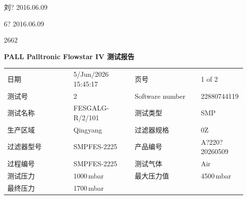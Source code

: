 \documentclass[UTF8,10pt,a4paper,fontset=fandol]{ctexart}
\newcommand{\fieldvalue}[1]{#1}
\newcommand{\handwritten}[1]{#1}
\begin{document}
\handwritten{刘? 2016.06.09}

\handwritten{6? 2016.06.09}

\handwritten{2662}


\newpage

\begin{center}
\textbf{PALL Palltronic Flowstar IV 测试报告}
\end{center}

\begin{tabular}{@{}p{0.27\linewidth}p{0.25\linewidth}p{0.27\linewidth}p{0.18\linewidth}@{}}
日期 &
\fieldvalue{5/Jun/2026 15:45:17} &
页号 &
\fieldvalue{1 of 2}
\\[2pt]

测试号 &
\fieldvalue{2} &
Software number &
\fieldvalue{22880744119}
\\[2pt]

测试名称 &
\fieldvalue{FESGALG-R/2/101} &
测试类型 &
\fieldvalue{SMP}
\\[2pt]

生产区域 &
\fieldvalue{Qingyang} &
过滤器规格 &
\fieldvalue{0Z}
\\[2pt]

过滤器型号 &
\fieldvalue{SMPFES-2225} &
产品编号 &
\fieldvalue{A?220?20260509}
\\[2pt]

过程编号 &
\fieldvalue{SMPFES-2225} &
测试气体 &
\fieldvalue{Air}
\\[2pt]

测试压力 &
\fieldvalue{1000\,mbar} &
最大压力值 &
\fieldvalue{4500\,mbar}
\\[2pt]

最终压力 &
\fieldvalue{1700\,mbar} &
\end{tabular}
\end{document}
